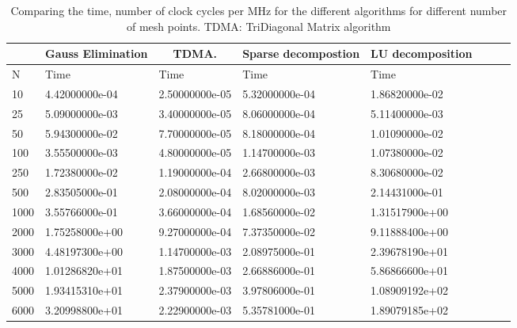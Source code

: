 \documentclass[11pt,a4paper,english,draft]{article}
\numberwithin{equation}{section}
\begin{document}
\begin{table}[ht!]
\centering
\caption{Comparing the time, number of clock cycles per MHz for the
different algorithms for different number of mesh points. TDMA: TriDiagonal
Matrix algorithm}
\vspace{3mm}
\begin{tabular}{|l|l|l|l|l|l|l|l|}
\hline
\multicolumn{1}{|c|}{ } & \multicolumn{1}{|c|}{Gauss Elimination} & \multicolumn{1}{|c|}{TDMA.} & \multicolumn{1}{|c|}{Sparse decompostion} & \multicolumn{1}{|c|}{LU decomposition}  \\
\hline
N & Time & Time & Time & Time  \\
\hline
10 & 4.42000000e-04 &   2.50000000e-05 &   5.32000000e-04 & 1.86820000e-02 \\
25 & 5.09000000e-03 &   3.40000000e-05 &   8.06000000e-04 & 5.11400000e-03 \\
50 & 5.94300000e-02 &   7.70000000e-05 &   8.18000000e-04 & 1.01090000e-02 \\
100 & 3.55500000e-03 &   4.80000000e-05 &   1.14700000e-03 & 1.07380000e-02 \\
250 & 1.72380000e-02 &   1.19000000e-04 &   2.66800000e-03 & 8.30680000e-02 \\
500 & 2.83505000e-01 &   2.08000000e-04 &   8.02000000e-03 & 2.14431000e-01 \\
1000 & 3.55766000e-01 &   3.66000000e-04 &   1.68560000e-02 & 1.31517900e+00 \\
2000 & 1.75258000e+00 &   9.27000000e-04 &   7.37350000e-02 & 9.11888400e+00 \\
3000 & 4.48197300e+00 &   1.14700000e-03 &   2.08975000e-01 & 2.39678190e+01 \\
4000 & 1.01286820e+01 &   1.87500000e-03 &   2.66886000e-01 & 5.86866600e+01 \\
5000 & 1.93415310e+01 &   2.37900000e-03 &   3.97806000e-01 & 1.08909192e+02 \\
6000 & 3.20998800e+01 &   2.22900000e-03 &   5.35781000e-01 & 1.89079185e+02 \\
\hline
\end{tabular}
\label{tab:time}
\end{table}
\end{document}
